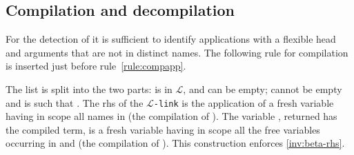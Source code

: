 \documentclass[sigconf,natbib=false,review]{acmart}
\newcommand{\appsep}{\ensuremath{\textcolor{lightgray}{\cdot}}}
\newcommand{\llambda}{\ensuremath{\mathcal{L}}\xspace}
\newcommand{\linkMacro}[1]{\ensuremath{#1}\texttt{-link}\xspace}
\newcommand{\linkbeta}{\linkMacro{\llambda}}
\newcommand{\Fo}{\texorpdfstring{\ensuremath{\mathcal{F}\xspace}}{F}} %
\newcommand{\linkbetaM}[3]{\ensuremath{#1 \vdash #2 =_{\llambda} #3}}
\newcommand{\rhs}{rhs\xspace}
\newcommand{\linkStore}{\texorpdfstring{\ensuremath{\mathbb{L}}\xspace}{L}}
\begin{document}

\subsection{Compilation and decompilation}

For the detection of \notllambda it
is sufficient to identify applications with a flexible head and arguments that
are not in distinct names. The following rule for \notllambda compilation
is inserted  just before rule~\ref{rule:compapp}.




\noindent
The list  is split into the two parts: 
 is in \llambda, and can be empty; 
 cannot be empty and is such that
.
The \rhs of the \linkbeta is
the application of a fresh variable  having
in scope all names in  (the compilation of ).
The variable , returned has the compiled term, is a fresh variable
having in scope all the free variables occurring in  and
 (the compilation of ).
This construction enforces \cref{inv:beta-rhs}.



\end{document}
